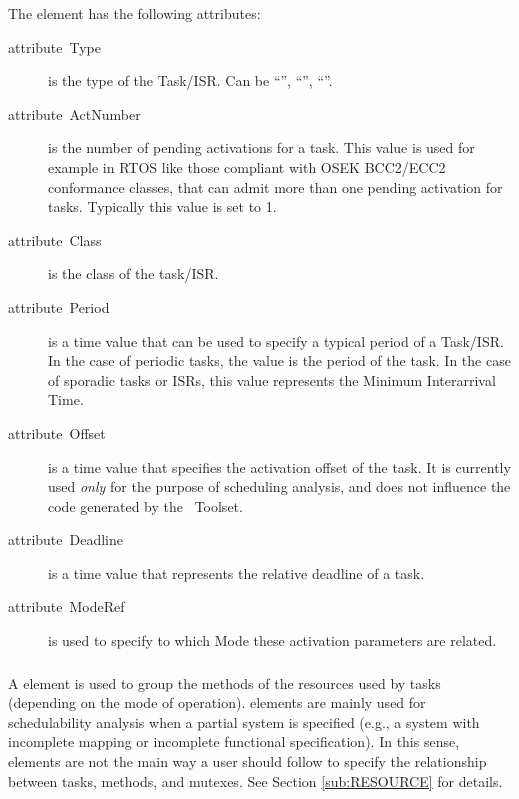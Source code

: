 The  element has the following attributes:
\begin{description}
\item [{attribute~Type}] is the type of the Task/ISR. Can be
  {}``'', {}``'',
  {}``''.
\item [{attribute~ActNumber}] is the number of pending activations for
  a task. This value is used for example in RTOS like those compliant
  with OSEK BCC2/ECC2 conformance classes, that can admit more than
  one pending activation for tasks. Typically this value is set to 1.
\item [{attribute~Class}] is the class of the task/ISR. %
\item [{attribute~Period}] is a time value that can be used to specify
  a typical period of a Task/ISR. In the case of periodic tasks, the
  value is the period of the task. In the case of sporadic tasks or
  ISRs, this value represents the Minimum Interarrival Time.%
\item [{attribute~Offset}] is a time value that specifies the
  activation offset of the task. It is currently used \emph{only} for
  the purpose of scheduling analysis, and does not influence the code
  generated by the \rtd\ Toolset.%
\item [{attribute~Deadline}] is a time value that represents the
  relative deadline of a task. %
\item [{attribute~ModeRef}] is used to specify to which Mode these activation
  parameters are related.%
\end{description}

\subsubsection{}

A  element is used to group the methods of the
resources used by tasks (depending on the mode of
operation).  elements are mainly used for
schedulability analysis when a partial system is specified (e.g., a
system with incomplete mapping or incomplete functional
specification). In this sense,  elements are not
the main way a user should follow to specify the relationship between
tasks, methods, and mutexes. See Section \ref{sub:RESOURCE} for
details.

